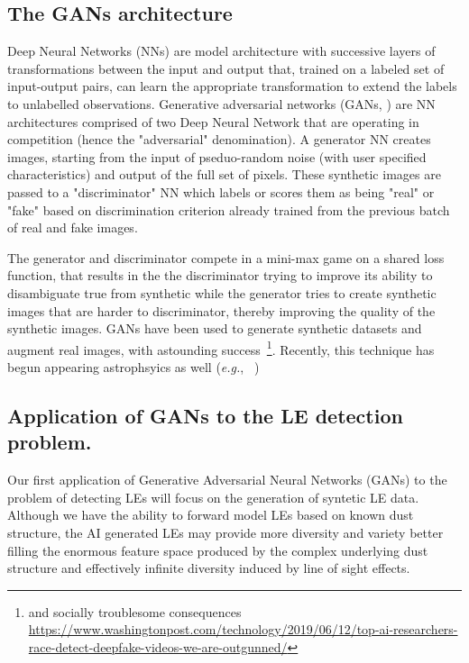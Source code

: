 \documentclass{proposalnsf}
\newcommand{\eg}{\emph{e.g.}}
\begin{document}
\subsection{The GANs architecture}

Deep Neural Networks (NNs) are model architecture with successive layers of transformations between the input and output that, trained on a labeled set of input-output pairs, can learn the appropriate transformation to extend the labels to unlabelled observations.
Generative adversarial networks (GANs, \citealt{Goodfellow14}) are NN architectures comprised of two Deep Neural Network \citep{lecun2015deep} that are operating in competition (hence the "adversarial" denomination). A generator NN creates images, starting from the input of pseduo-random noise (with user specified characteristics)  and output of the full set of pixels. These synthetic images are passed to a "discriminator" NN which labels or scores them as being "real" or "fake" based on discrimination criterion already trained from the previous batch of real and fake images. 

The generator and discriminator compete in a mini-max game on a shared loss function, that results in the the discriminator trying to improve its ability to disambiguate true from synthetic while the generator tries to create synthetic images that are harder to discriminator, thereby improving the quality of the synthetic images. GANs have been used to generate synthetic datasets and augment real images, with astounding success~\citep{shrivastava2016learning, Maras19}\footnote{and socially troublesome consequences \\\url{https://www.washingtonpost.com/technology/2019/06/12/top-ai-researchers-race-detect-deepfake-videos-we-are-outgunned/}}. Recently, this technique has begun appearing astrophsyics as well (\eg,~
\citealt{Zamudio19})


\subsection{Application of GANs to the LE detection problem.}

Our first application of Generative Adversarial Neural Networks (GANs) to the problem of detecting LEs will focus on the generation of syntetic LE data. Although we have the ability to forward model LEs based on known dust structure, the AI generated LEs may provide more diversity and variety better filling the enormous feature space produced by the complex underlying dust structure and effectively infinite diversity induced by line of sight effects.
\end{document}

